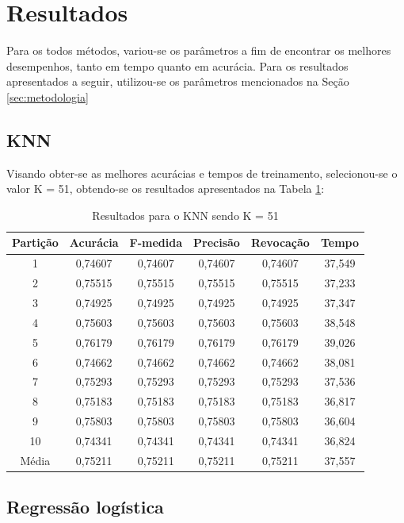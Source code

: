 \section{Resultados}

Para os todos métodos, variou-se os parâmetros a fim de encontrar os melhores desempenhos, tanto em tempo quanto em acurácia. Para os resultados apresentados a seguir, utilizou-se os parâmetros mencionados na Seção \ref{sec:metodologia}

\subsection{KNN}

Visando obter-se as melhores acurácias e tempos de treinamento, selecionou-se o valor K = 51, obtendo-se os resultados apresentados na Tabela \ref{table:resultadosKNN}:

\begin{table}[h]
\centering
\caption{Resultados para o KNN sendo K = 51}
\vspace{0.2cm}
\begin{tabular}{c|c|c|c|c|c}
Partição & Acurácia & F-medida & Precisão & Revocação & Tempo \\
\hline
1  & 0,74607 & 0,74607 & 0,74607 & 0,74607 & 37,549 \\
2  & 0,75515 & 0,75515 & 0,75515 & 0,75515 & 37,233 \\
3  & 0,74925 & 0,74925 & 0,74925 & 0,74925 & 37,347 \\
4  & 0,75603 & 0,75603 & 0,75603 & 0,75603 & 38,548 \\
5  & 0,76179 & 0,76179 & 0,76179 & 0,76179 & 39,026 \\
6  & 0,74662 & 0,74662 & 0,74662 & 0,74662 & 38,081 \\
7  & 0,75293 & 0,75293 & 0,75293 & 0,75293 & 37,536 \\
8  & 0,75183 & 0,75183 & 0,75183 & 0,75183 & 36,817 \\
9  & 0,75803 & 0,75803 & 0,75803 & 0,75803 & 36,604 \\
10 & 0,74341 & 0,74341 & 0,74341 & 0,74341 & 36,824 \\
\hline
Média & 0,75211 & 0,75211 & 0,75211 & 0,75211 & 37,557

\end{tabular} 
\label{table:resultadosKNN}
\end{table}

\subsection{Regressão logística}

